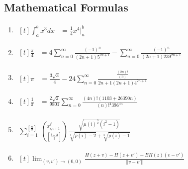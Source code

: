 \documentclass{article}
\begin{document}
        \subsection{Mathematical Formulas}
            \begin{enumerate}
                \item %
                $
                \!
                \begin{aligned}[t]
                 \int_a^bx^3dx&=\frac{1}{4}x^4\bigl\lvert_a^b
                \end{aligned}
                $
                
                \item %
                $
                \!
                \begin{aligned}[t]
                 \frac{\pi}{4}&=4\sum_{n=0}^\infty\frac{(-1)^n}{(2n+1)5^{2n+1}}-\sum_{n=0}^\infty\frac{(-1)^n}{(2n+1)239^{2n+1}}
                \end{aligned}
                $
                
                \item %
                $
                \!
                \begin{aligned}[t]
                 \pi&=\frac{3\sqrt{3}}{4}-24\sum_{n=0}^{\infty}\frac{\frac{(2n)!}{(n)}}{2n+1(2n+1)4^{2n+1}}
                \end{aligned}
                $
                
                \item %
                $
                \!
                \begin{aligned}[t]
                 \frac{1}{\pi}&=\frac{2\sqrt{2}}{9801}\sum_{n=0}^{\infty}\frac{(4n)!(1103+26390n)}{(n)!^4{396}^{4n}}
                \end{aligned}
                $
                
                
                \item %
                $
                \begin{aligned}
                 \sum\nolimits_{i=1}^{[\frac{n}{2}]}\ \left ( _{[\frac{i+3}{3}]}^{x^{i^2}_{i,i+1}} \right )\frac{\sqrt{\mu(i)^\frac{3}{2}(i^2-1)}}{\sqrt[3]{\rho(i)-2}+\sqrt[3]{\rho(i)-1}}
                \end{aligned}
                $
                
                \item%
                $
                \!
                \begin{aligned}[t]
                    \lim\nolimits_{(v,v \prime) \to (0,0)}\frac{H(z+v)-H(z+v\prime)-BH(z)(v-v\prime)}{||v-v\prime||}
                \end{aligned}
                $
                

\end{enumerate}
\end{document}
